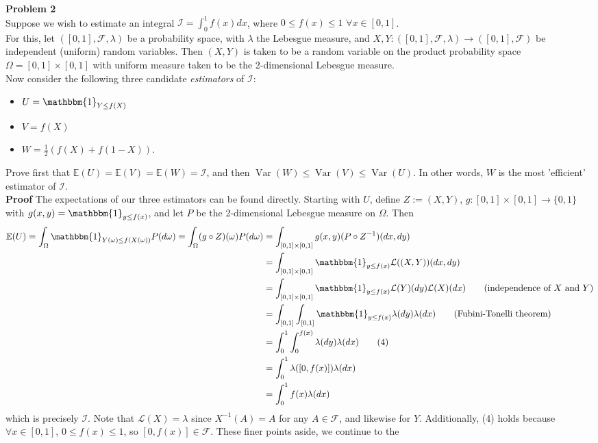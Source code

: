 \documentclass[10pt]{article}
\newcommand{\E}{\mathbb{E}}
\newcommand{\1}[1]{\mathbbm{1}_{#1}}
\newcommand{\mc}[1]{\mathcal{#1}}
\DeclareMathOperator{\Var}{Var}
\begin{document}
    {\bf Problem 2}\\[5pt]
    Suppose we wish to estimate an integral $\mc{I}=\int_0^1f(x)dx$, where $0\leq f(x)\leq 1$ $\forall x\in[0,1]$. \\[5pt]
    For this, let $([0,1],\mc{F},\lambda)$ be a probability space, with $\lambda$ the Lebesgue measure, and $X,Y:([0,1],\mc{F},\lambda)\rightarrow([0,1],\mc{F})$ be independent
    (uniform) random variables. Then $(X,Y)$ is taken to be a random variable on the product probability space $\Omega=[0,1]\times[0,1]$ with uniform measure taken to be
    the 2-dimensional Lebesgue measure.\\[5pt]
    Now consider the following three candidate {\it estimators} of $\mc{I}$:
    \begin{itemize}
        \item $U=\1{Y\leq f(X)}$
        \item $V=f(X)$
        \item $W=\frac{1}{2}(f(X)+f(1-X))$.
    \end{itemize}
    Prove first that $\E(U)=\E(V)=\E(W)=\mc{I}$, and then $\Var(W)\leq\Var(V)\leq \Var(U)$. In other words, $W$ is the most 'efficient' estimator of $\mc{I}$.\\[5pt]
    {\bf Proof}\hspace{5pt} The expectations of our three estimators can be found directly. Starting with $U$, define $Z:=(X,Y)$, $g:[0,1]\times[0,1]\rightarrow\{0,1\}$ with $g(x,y)=\1{y\leq f(x)}$, and let $P$ be the 2-dimensional Lebesgue measure on $\Omega$. Then
    \begin{align*}
        \E(U)=\int_\Omega\1{Y(\omega)\leq f(X(\omega))}P(d\omega)=\int_\Omega (g\circ Z)(\omega)P(d\omega)&=\int_{[0,1]\times[0,1]}g(x,y)(P\circ Z^{-1})(dx, dy)\\
        &=\int_{[0,1]\times[0,1]}\1{y\leq f(x)}\mc{L}((X,Y))(dx, dy)\\
        &=\int_{[0,1]\times[0,1]}\1{y\leq f(x)}\mc{L}(Y)(dy)\mc{L}(X)(dx)\tag{independence of $X$ and $Y$}\\
        &=\int_{[0,1]}\int_{[0,1]}\1{y\leq f(x)}\lambda(dy)\lambda(dx)\tag{Fubini-Tonelli theorem}\\
        &=\int_0^1\int_0^{f(x)}\lambda(dy)\lambda(dx)\tag{4}\\
        &=\int_{0}^1\lambda([0,f(x)])\lambda(dx)\\
        &=\int_0^1f(x)\lambda(dx)
    \end{align*}
    which is precisely $\mc{I}$. Note that $\mc{L}(X)=\lambda$ since $X^{-1}(A)=A$ for any $A\in\mc{F}$, and likewise for $Y$. Additionally, (4) holds because $\forall x\in[0,1]$, $0\leq f(x)\leq 1$, so $[0,f(x)]\in\mc{F}$. These finer points aside, we continue to the
\end{document}
